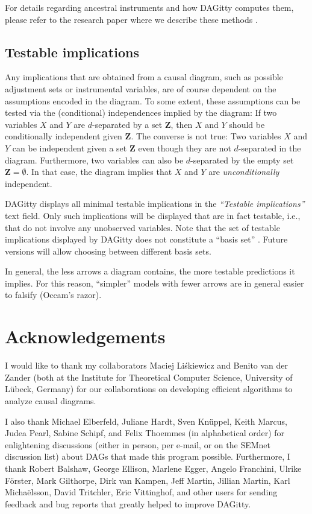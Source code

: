\documentclass[a4paper]{article} %
\newcommand{\pp}{{\sc DAG}itty\xspace}
\newcommand{\action}[1]{\emph{``#1''}}
\begin{document}
For details regarding ancestral instruments and how \pp computes them, please
refer to the research paper where we describe these methods \cite{zander15_instrument}.

\subsection{Testable implications}

Any implications that are obtained from a causal diagram,
such as possible adjustment sets or instrumental variables,
are of course dependent on the 
assumptions encoded in the diagram.
To some extent, these assumptions can be tested via the 
(conditional) independences implied by the diagram: If two 
variables $X$ and $Y$ are $d$-separated by a set $\mathbf{Z}$, then
$X$ and $Y$ should be conditionally independent
given $\mathbf{Z}$. The converse is not true: Two variables
$X$ and $Y$ can be independent given a set $\mathbf{Z}$ even though they
are not $d$-separated in the diagram. Furthermore, two 
variables can also be $d$-separated by the empty set $\mathbf{Z}=\emptyset$.
In that case, the diagram implies that $X$ and $Y$ are
\emph{unconditionally} independent.

\pp displays all minimal testable implications 
in the \action{Testable implications} text field. Only such
implications will be displayed that are in fact testable,
i.e., that do not involve any unobserved variables. Note
that the set of testable implications displayed by \pp
does not constitute a ``basis set'' \cite{Pearl2009}. 
Future versions will allow choosing between different basis sets. 

In general, the less arrows a diagram contains, the more testable
predictions it implies. For this reason, ``simpler'' models with
fewer arrows are in general easier to falsify (Occam's razor).


\section{Acknowledgements}

I would like to thank my collaborators Maciej Li\'skiewicz
and Benito van der Zander (both at the Institute for Theoretical Computer Science,
University of L\"ubeck, Germany) for our collaborations on developing efficient algorithms
to analyze causal diagrams.  

I also thank Michael Elberfeld, Juliane Hardt, 
Sven Kn\"{u}ppel, Keith Marcus, Judea Pearl, Sabine Schipf, 
and Felix Thoemmes (in alphabetical order) for enlightening discussions
(either in person, per e-mail, or on the SEMnet discussion list)
about DAGs that made this program possible. Furthermore, I thank
Robert Balshaw, George Ellison, 
Marlene Egger, Angelo Franchini,  Ulrike F\"{o}rster, Mark Gilthorpe, 
Dirk van Kampen,
Jeff Martin, Jillian Martin, Karl Micha\"{e}lsson,
David Tritchler, Eric Vittinghof, 
and other users for sending feedback and bug reports that greatly
helped to improve \pp. 
\end{document}
